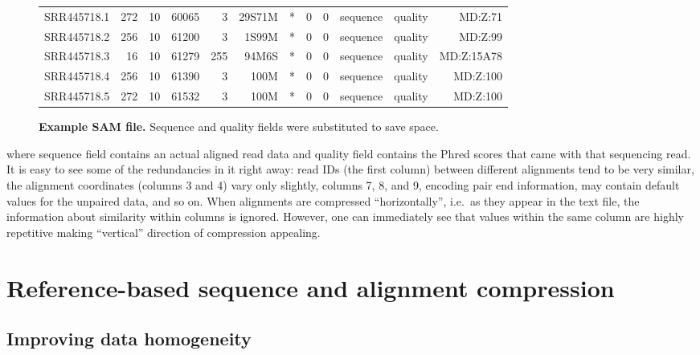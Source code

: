 \documentclass[12pt]{cmuthesis}
\begin{document}
  \begin{figure}[h!]
  \footnotesize
  \begin{tabular}{l r r r r r r r r r r r}
    \midrule
    SRR445718.1 & 272 & 10 & 60065 & 3 & 29S71M & * & 0 & 0 & sequence & quality & MD:Z:71 \\
    SRR445718.2 & 256 & 10 & 61200 & 3 & 1S99M & * & 0 & 0 & sequence &   quality & MD:Z:99 \\
    SRR445718.3 & 16 & 10 & 61279 & 255 & 94M6S & * & 0 & 0 & sequence & quality & MD:Z:15A78 \\
    SRR445718.4 & 256 & 10 & 61390 & 3 & 100M & * & 0 & 0 & sequence & quality & MD:Z:100 \\
    SRR445718.5 & 272 & 10 & 61532 & 3 & 100M & * & 0 & 0 & sequence & quality & MD:Z:100 \\
    \bottomrule
  \end{tabular}
  \caption{\textbf{Example SAM file.} Sequence and quality fields were substituted to save space.}
  \end{figure}
  \normalsize
  \noindent
  where sequence field contains an actual aligned read data and quality field contains the Phred scores that came with that sequencing read. It is easy to see some of the redundancies in it right away: read IDs (the first column) between different alignments tend to be very similar, the alignment coordinates (columns 3 and 4) vary only slightly, columns 7, 8, and 9, encoding pair end information, may contain default values for the unpaired data, and so on. When alignments are compressed ``horizontally'', i.e.\@~as they appear in the text file, the information about similarity within columns is ignored. However, one can immediately see that values within the same column are highly repetitive making ``vertical'' direction of compression appealing.

\section{Reference-based sequence and alignment compression}

  \subsection{Improving data homogeneity}
\end{document}
